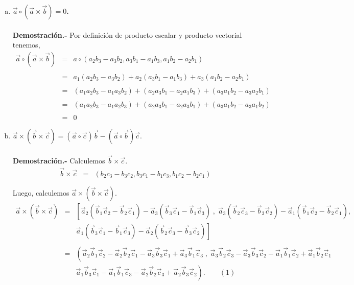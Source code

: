 \begin{enumerate}
\begin{enumerate}[a)]
	    \item \textbf{\boldmath $\vec{a}\circ \left(\vec{a}\times \vec{b}\right)=0$.\\\\
		Demostración.-}\; Por definición de producto escalar y producto vectorial tenemos,
		$$\begin{array}{rcl}
		    \vec{a}\circ \left(\vec{a}\times \vec{b}\right)&=&a\circ \left(a_2b_3-a_3b_2,a_3b_1-a_1b_3,a_1b_2-a_2b_1\right)\\\\
		    &=&a_1\left(a_2b_3-a_3b_2\right)+a_2\left(a_3b_1-a_1b_3\right)+a_3\left(a_1b_2-a_2b_1\right)\\\\
		    &=&\left(a_1a_2b_3-a_1a_3b_2\right) + \left(a_2a_3b_1-a_2a_1b_3\right) + \left(a_3a_1b_2-a_3a_2b_1\right)\\\\
		    &=&(a_1a_2b_3-a_1a_2b_3)+(a_2a_3b_1-a_2a_3b_1)+(a_3a_1b_2-a_3a_1b_2)\\\\
		    &=&0\
		\end{array}$$
		\vspace{.4cm}

	    \item \textbf{\boldmath $\vec{a}\times \left(\vec{b}\times \vec{c}\right)=\left(\vec{a}\circ \vec{c}\right)\vec{b}-\left(\vec{a}\circ \vec{b}\right)\vec{c}.$\\\\
		Demostración.-}\; Calculemos $\vec{b}\times \vec{c}$.
		$$\begin{array}{rcl}
		    \vec{b}\times \vec{c}&=&\left(b_2c_3-b_3c_2,b_3c_1-b_1c_3,b_1c_2-b_2c_1\right)\\\\
		\end{array}$$
		Luego, calculemos $\vec{a}\times \left(\vec{b}\times \vec{c}\right)$.
		$$\begin{array}{rcl}
		    \vec{a}\times \left(\vec{b}\times \vec{c}\right)&=&\left[\vec{a}_2\left(\vec{b}_1\vec{c}_2-\vec{b}_2\vec{c}_1\right)-\vec{a}_3\left(\vec{b}_3\vec{c}_1-\vec{b}_1\vec{c}_3\right)\; , \; \vec{a}_3\left(\vec{b}_2\vec{c}_3-\vec{b}_3\vec{c}_2\right)-\vec{a}_1\left(\vec{b}_1\vec{c}_2-\vec{b}_2\vec{c}_1\right),\right.\\
								    &&\left.\vec{a}_1\left(\vec{b}_3\vec{c}_1-\vec{b}_1\vec{c}_3\right)-\vec{a}_2\left( \vec{b}_2\vec{c}_3-\vec{b}_3\vec{c}_2\right)\right]\\\\
								    &=& \left(\vec{a}_2\vec{b}_1\vec{c}_2-\vec{a}_2\vec{b}_2\vec{c}_1-\vec{a}_3\vec{b}_3\vec{c}_1+\vec{a}_3\vec{b}_1\vec{c}_3\; , \; \vec{a}_3\vec{b}_2\vec{c}_3-\vec{a}_3\vec{b}_3\vec{c}_2-\vec{a}_1\vec{b}_1\vec{c}_2+\vec{a}_1\vec{b}_2\vec{c}_1\right.\\
								    &&\left.\vec{a}_1\vec{b}_3\vec{c}_1-\vec{a}_1\vec{b}_1\vec{c}_3-\vec{a}_2\vec{b}_2\vec{c}_3+\vec{a}_2\vec{b}_3\vec{c}_2\right).\qquad (1)\\\\
		\end{array}$$


\end{enumerate}
\end{enumerate}
